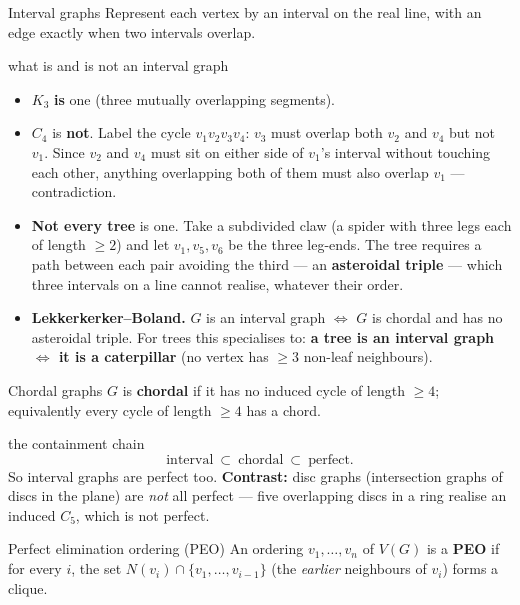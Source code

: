 \begin{prob}{Interval graphs}
Represent each vertex by an interval on the real line, with an edge exactly when two intervals
overlap.
\end{prob}

\begin{facts}{what is and is not an interval graph}
\begin{itemize}
  \item $K_3$ \textbf{is} one (three mutually overlapping segments).
  \item $C_4$ is \textbf{not}. Label the cycle $v_1v_2v_3v_4$: $v_3$ must overlap both $v_2$ and
        $v_4$ but not $v_1$. Since $v_2$ and $v_4$ must sit on either side of $v_1$'s interval
        without touching each other, anything overlapping both of them must also overlap $v_1$ ---
        contradiction.
  \item \textbf{Not every tree} is one. Take a subdivided claw (a spider with three legs each of
        length $\ge2$) and let $v_1,v_5,v_6$ be the three leg-ends. The tree requires a path
        between each pair avoiding the third --- an \textbf{asteroidal triple} --- which three
        intervals on a line cannot realise, whatever their order.
  \item \textbf{Lekkerkerker--Boland.} $G$ is an interval graph $\iff$ $G$ is chordal and has no
        asteroidal triple. For trees this specialises to: \textbf{a tree is an interval graph
        $\iff$ it is a caterpillar} (no vertex has $\ge3$ non-leaf neighbours).
\end{itemize}
\end{facts}

\begin{prob}{Chordal graphs}
$G$ is \textbf{chordal} if it has no induced cycle of length $\ge4$; equivalently every cycle of
length $\ge4$ has a chord.
\end{prob}

\begin{facts}{the containment chain}
\[
  \text{interval}\ \subset\ \text{chordal}\ \subset\ \text{perfect}.
\]
So interval graphs are perfect too. \textbf{Contrast:} disc graphs (intersection graphs of discs
in the plane) are \emph{not} all perfect --- five overlapping discs in a ring realise an induced
$C_5$, which is not perfect.
\end{facts}

\begin{prob}{Perfect elimination ordering (PEO)}
An ordering $v_1,\dots,v_n$ of $V(G)$ is a \textbf{PEO} if for every $i$, the set
$N(v_i)\cap\{v_1,\dots,v_{i-1}\}$ (the \emph{earlier} neighbours of $v_i$) forms a clique.
\end{prob}

